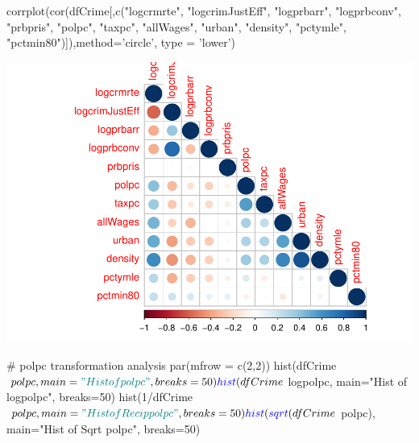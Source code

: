 \documentclass[]{article}
\newenvironment{Shaded}{}{}
\newcommand{\CommentTok}[1]{\textcolor[rgb]{0.00,0.50,0.00}{#1}}
\newcommand{\DataTypeTok}[1]{#1}
\newcommand{\DecValTok}[1]{#1}
\newcommand{\KeywordTok}[1]{\textcolor[rgb]{0.00,0.00,1.00}{#1}}
\newcommand{\NormalTok}[1]{#1}
\newcommand{\OperatorTok}[1]{#1}
\newcommand{\StringTok}[1]{\textcolor[rgb]{0.00,0.50,0.50}{#1}}
\begin{document}
\begin{Shaded}
\begin{Highlighting}[]
\KeywordTok{corrplot}\NormalTok{(}\KeywordTok{cor}\NormalTok{(dfCrime[,}\KeywordTok{c}\NormalTok{(}\StringTok{"logcrmrte"}\NormalTok{, }\StringTok{"logcrimJustEff"}\NormalTok{, }\StringTok{"logprbarr"}\NormalTok{, }\StringTok{"logprbconv"}\NormalTok{, }
                        \StringTok{"prbpris"}\NormalTok{, }\StringTok{"polpc"}\NormalTok{, }\StringTok{"taxpc"}\NormalTok{, }\StringTok{"allWages"}\NormalTok{, }\StringTok{"urban"}\NormalTok{, }\StringTok{"density"}\NormalTok{,}
                        \StringTok{"pctymle"}\NormalTok{, }\StringTok{"pctmin80"}\NormalTok{)]),}\DataTypeTok{method=}\StringTok{'circle'}\NormalTok{, }\DataTypeTok{type =} \StringTok{'lower'}\NormalTok{)}
\end{Highlighting}
\end{Shaded}

\includegraphics{Bagnard_Gaustad_Hartman_Leung_Lab_3_files/figure-latex/unnamed-chunk-86-1.pdf}

\begin{Shaded}
\begin{Highlighting}[]
\CommentTok{# polpc transformation analysis }
\KeywordTok{par}\NormalTok{(}\DataTypeTok{mfrow =} \KeywordTok{c}\NormalTok{(}\DecValTok{2}\NormalTok{,}\DecValTok{2}\NormalTok{))}
\KeywordTok{hist}\NormalTok{(dfCrime}\OperatorTok{$}\NormalTok{polpc, }\DataTypeTok{main=}\StringTok{"Hist of polpc"}\NormalTok{, }\DataTypeTok{breaks=}\DecValTok{50}\NormalTok{)}
\KeywordTok{hist}\NormalTok{(dfCrime}\OperatorTok{$}\NormalTok{logpolpc, }\DataTypeTok{main=}\StringTok{"Hist of logpolpc"}\NormalTok{, }\DataTypeTok{breaks=}\DecValTok{50}\NormalTok{)}
\KeywordTok{hist}\NormalTok{(}\DecValTok{1}\OperatorTok{/}\NormalTok{dfCrime}\OperatorTok{$}\NormalTok{polpc, }\DataTypeTok{main=}\StringTok{"Hist of Recip polpc"}\NormalTok{, }\DataTypeTok{breaks=}\DecValTok{50}\NormalTok{)}
\KeywordTok{hist}\NormalTok{(}\KeywordTok{sqrt}\NormalTok{(dfCrime}\OperatorTok{$}\NormalTok{polpc), }\DataTypeTok{main=}\StringTok{"Hist of Sqrt polpc"}\NormalTok{, }\DataTypeTok{breaks=}\DecValTok{50}\NormalTok{)}
\end{Highlighting}
\end{Shaded}
\end{document}

